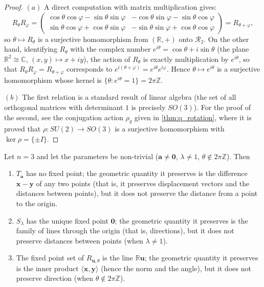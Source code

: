\begin{proof}
$(a)$ A direct computation with matrix multiplication gives:
\[
R_\theta R_\varphi =
\begin{pmatrix}
\cos\theta\cos\varphi - \sin\theta\sin\varphi & -\cos\theta\sin\varphi - \sin\theta\cos\varphi \\
\sin\theta\cos\varphi + \cos\theta\sin\varphi & -\sin\theta\sin\varphi + \cos\theta\cos\varphi
\end{pmatrix}
= R_{\theta+\varphi},
\]
so $\theta \mapsto R_\theta$ is a surjective homomorphism from $(\mathbb R,+)$ onto $\mathcal R_2$. On the other hand, identifying $R_\theta$ with the complex number $e^{i\theta}=\cos\theta+i\sin\theta$ (the plane $\mathbb R^2 \cong \mathbb C$, $(x,y)\mapsto x+iy$), the action of $R_\theta$ is exactly multiplication by $e^{i\theta}$, so that $R_\theta R_\varphi = R_{\theta+\varphi}$ corresponds to $e^{i(\theta+\varphi)} = e^{i\theta}e^{i\varphi}$. Hence $\theta\mapsto e^{i\theta}$ is a surjective homomorphism whose kernel is $\{\theta : e^{i\theta}=1\} = 2\pi\mathbb Z$.

$(b)$ The first relation is a standard result of linear algebra (the set of all orthogonal matrices with determinant $1$ is precisely $SO(3)$). For the proof of the second, see the conjugation action $\rho_q$ given in \cref{thm:q_rotation}, where it is proved that $\rho: SU(2)\to SO(3)$ is a surjective homomorphism with $\ker\rho = \{\pm I\}$.
\end{proof}

\begin{proposition}\label{prop:transform_invariants}
Let $n=3$ and let the parameters be non-trivial ($\mathbf a \ne \mathbf 0$, $\lambda \ne 1$, $\theta \notin 2\pi\mathbb Z$). Then
\begin{enumerate}[label=(\roman*)]
    \item $T_{\mathbf a}$ has no fixed point; the geometric quantity it preserves is the difference $\mathbf x - \mathbf y$ of any two points (that is, it preserves displacement vectors and the distances between points), but it does not preserve the distance from a point to the origin.
    \item $S_\lambda$ has the unique fixed point $\mathbf{0}$; the geometric quantity it preserves is the family of lines through the origin (that is, directions), but it does not preserve distances between points (when $\lambda\ne1$).
    \item The fixed point set of $R_{\mathbf u,\theta}$ is the line $\mathbb R\mathbf u$; the geometric quantity it preserves is the inner product $\langle\mathbf x,\mathbf y\rangle$ (hence the norm and the angle), but it does not preserve direction (when $\theta\notin 2\pi\mathbb Z$).
\end{enumerate}
\end{proposition}

